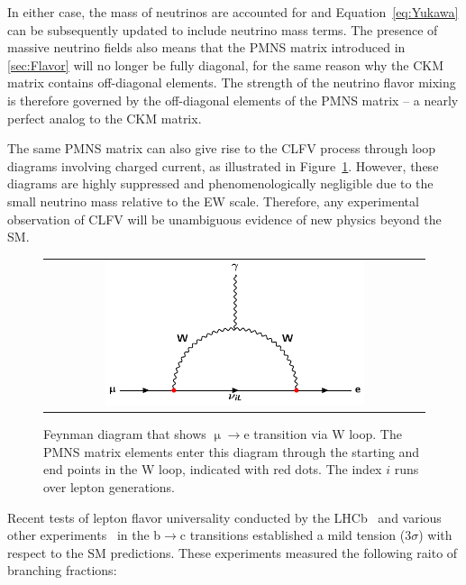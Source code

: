 In either case, the mass of neutrinos are accounted for and Equation~\ref{eq:Yukawa} can be subsequently updated to include neutrino mass terms. The presence of massive neutrino fields also means that the \ac{PMNS} matrix introduced in \autoref{sec:Flavor} will no longer be fully diagonal, for the same reason why the \ac{CKM} matrix contains off-diagonal elements. The strength of the neutrino flavor mixing is therefore governed by the off-diagonal elements of the \ac{PMNS} matrix -- a nearly perfect analog to the \ac{CKM} matrix. 

The same \ac{PMNS} matrix can also give rise to the \ac{CLFV} process through loop diagrams involving charged current, as illustrated in Figure~\ref{fig:mutoe}. However, these diagrams are highly suppressed and phenomenologically negligible due to the small neutrino mass relative to the \ac{EW} scale. Therefore, any experimental observation of \ac{CLFV} will be unambiguous evidence of new physics beyond the \ac{SM}.

\begin{figure}[tbh!]
 \begin{center}
 \begin{tabular}{c}
 \includegraphics[width=0.7\textwidth]{figures/Part1/BSM/mutoe}
 \end{tabular}
 \caption{Feynman diagram that shows $\upmu\rightarrow$e transition via W loop. The \ac{PMNS} matrix elements enter this diagram through the starting and end points in the W loop, indicated with red dots. The index $i$ runs over lepton generations.}
 \label{fig:mutoe}
 \end{center}
\end{figure}

Recent tests of lepton flavor universality conducted by the \ac{LHCb}~\cite{LHCb:2023zxo} and various other experiments~\cite{HFLAV} in the b$\rightarrow$c transitions established a mild tension (3$\sigma$) with respect to the \ac{SM} predictions. These experiments measured the following raito of branching fractions:

